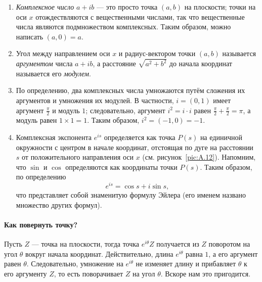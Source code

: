 \begin{enumerate}
\item \emph{Комплексное число} $a+ib$ --- это просто точка $(a, b)$ на плоскости;
точки на оси $x$ отождествляются с вещественными числами, так что вещественные числа являются подмножеством комплексных.
Таким образом, можно написать $(a, 0)=a$.

\item Угол между направлением оси $x$ и радиус-вектором точки $(a, b)$ называется
\textit{аргументом} числа $a+ib$, а расстояние $\sqrt{a^2+b^2}$ до начала координат называется
его \textit{модулем}.

\item По определению, два комплексных числа умножаются путём сложения их аргументов и умножения их модулей.
В частности, $i=(0, 1)$ имеет аргумент $\tfrac\pi2$ и модуль $1$;
следовательно, аргумент $i^2=i \cdot i$ равен $\tfrac\pi2+\tfrac\pi2=\pi$, а модуль равен $1\times1=1$.
Таким образом, $i^2=(-1,0)=-1$.

\item Комплексная экспонента $e^{is}$ определяется как точка $P(s)$ на единичной окружности с центром в начале координат, отстоящая по дуге на расстоянии $s$ от положительного направления оси $x$ (см. рисунок~\ref{pic:A.12}).
Напомним, что $\sin$ и $\cos$ определяются как координаты точки $P(s)$.
Таким образом, по определению
\[e^{is}=\cos s+i\sin s,\]
что представляет собой знаменитую формулу Эйлера (его именем названо множество других формул).

\end{enumerate}

\paragraph{Как повернуть точку?}
Пусть $Z$ --- точка на плоскости, тогда точка $e^{i\theta} Z$ получается из $Z$ поворотом на угол $\theta$ вокруг начала координат.
Действительно, длина $e^{i\theta}$ равна $1$, а его аргумент равен $\theta$.
Следовательно, умножение на $e^{i\theta}$ не изменяет длину и прибавляет $\theta$ к его аргументу $Z$, то есть поворачивает $Z$ на угол $\theta$.
Вскоре нам это пригодится.





